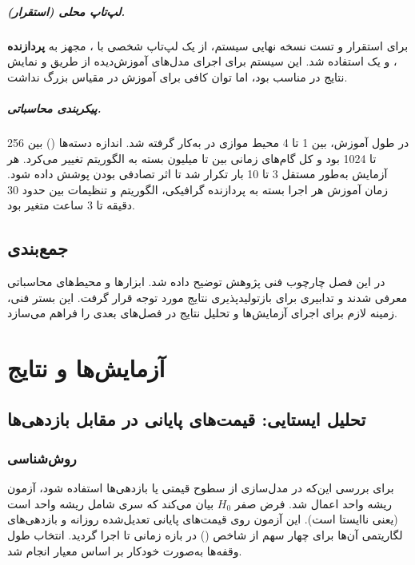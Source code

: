 \documentclass[12pt, a4paper]{report}
\begin{document}
\paragraph{لپ‌تاپ محلی (استقرار).}
برای استقرار و تست نسخه نهایی سیستم،  
از یک لپ‌تاپ شخصی با ،  
مجهز به \textbf{پردازنده }،   
و یک  استفاده شد.  
این سیستم برای اجرای مدل‌های آموزش‌دیده از طریق   
و نمایش نتایج در  مناسب بود،  
اما توان کافی برای آموزش در مقیاس بزرگ نداشت.  

\paragraph{پیکربندی محاسباتی.}
در طول آموزش، بین 1 تا 4 محیط موازی در  به‌کار گرفته شد.  
اندازه دسته‌ها () بین 256 تا 1024 بود  
و کل گام‌های زمانی بین  تا  میلیون بسته به الگوریتم تغییر می‌کرد.  
هر آزمایش به‌طور مستقل 3 تا 10 بار تکرار شد تا اثر تصادفی بودن پوشش داده شود.  
زمان آموزش هر اجرا بسته به پردازنده گرافیکی، الگوریتم و تنظیمات  
بین حدود 30 دقیقه تا 3 ساعت متغیر بود.  

\section{جمع‌بندی}

در این فصل چارچوب فنی پژوهش توضیح داده شد.  
ابزارها و محیط‌های محاسباتی معرفی شدند و تدابیری برای بازتولیدپذیری نتایج مورد توجه قرار گرفت.  
این بستر فنی، زمینه لازم برای اجرای آزمایش‌ها و تحلیل نتایج در فصل‌های بعدی را فراهم می‌سازد.  


\chapter{آزمایش‌ها و نتایج}

\section{تحلیل ایستایی: قیمت‌های پایانی در مقابل بازدهی‌ها}

\subsection{روش‌شناسی}
برای بررسی این‌که در مدل‌سازی از سطوح قیمتی یا بازدهی‌ها استفاده شود، 
آزمون ریشه واحد  اعمال شد.  
فرض صفر $H_0$ بیان می‌کند که سری شامل ریشه واحد است (یعنی ناایستا است).  
این آزمون روی قیمت‌های پایانی تعدیل‌شده روزانه و بازدهی‌های لگاریتمی آن‌ها 
برای چهار سهم از شاخص  () 
در بازه زمانی  تا  اجرا گردید.  
انتخاب طول وقفه‌ها به‌صورت خودکار بر اساس معیار  انجام شد.  
\end{document}

